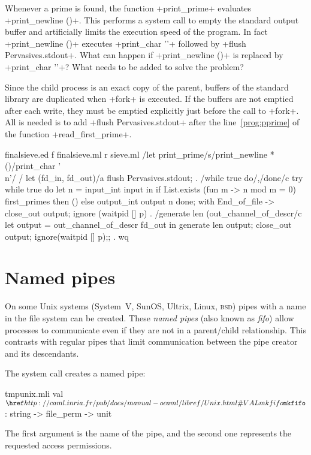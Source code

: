 \begin{exercise}
Whenever a prime is found, the function \ml+print_prime+ evaluates
\ml+print_newline ()+. This performs a system call to empty the standard
output buffer and artificially limits the execution speed of the program.
In fact \ml+print_newline ()+ executes \ml+print_char '\n'+
followed by \ml+flush Pervasives.stdout+. What can happen if
\ml+print_newline ()+ is replaced by \ml+print_char '\n'+? What needs
to be added to solve the problem?
\end{exercise}
\begin{answer}
Since the child process is an exact copy of the parent, \io{}
buffers of the standard library are duplicated when \ml+fork+ is
executed. If the buffers are not emptied after each write,
they must be emptied explicitly just before the call to
\ml+fork+. All is needed is to add 
\ml+flush Pervasives.stdout+ after the line~\ref{prog:pprime} of the 
function \ml+read_first_prime+.
\end{answer}
%
\begin{codefile}{finalsieve.ed}
f finalsieve.ml
r sieve.ml
/let print_prime/s/print_newline *()/print_char '\\n'/
/    let (fd_in, fd_out)/a
    flush Pervasives.stdout;
.
/while true do/,/done/c
        try 
          while true do
            let n = input_int input in
            if List.exists (fun m -> n mod m = 0) first_primes then ()
            else output_int output n
          done;
        with End_of_file -> 
          close_out output;
          ignore (waitpid [] p)
.
/generate len (out_channel_of_descr/c
      let output = out_channel_of_descr fd_out in
      generate len output;
      close_out output;
      ignore(waitpid [] p);;
.
wq
\end{codefile}

\section{Named pipes}

On some Unix systems (System~V, SunOS, Ultrix, Linux, \textsc{bsd})
pipes with a name in the file system can be created. These \emph{named
  pipes} (also known as \emph{fifo}) allow processes to communicate
even if they are not in a parent/child relationship. This contrasts
with regular pipes that limit communication between the pipe creator
and its descendants.

The system call  creates a named pipe: 
%
\begin{listingcodefile}{tmpunix.mli}
val $\libvalue{Unix}{mkfifo}$ : string -> file_perm -> unit
\end{listingcodefile}
%
The first argument is the name of the pipe, and the second one represents the
requested access permissions.

